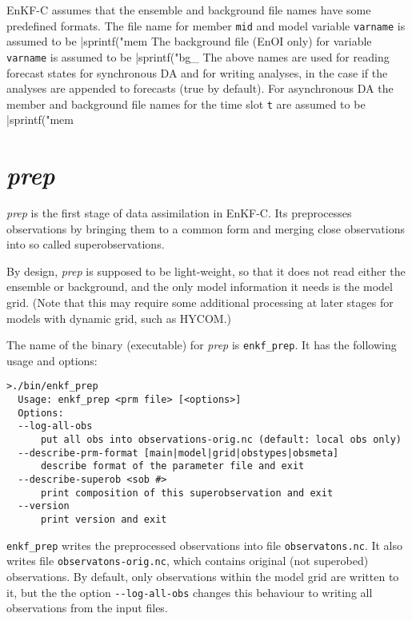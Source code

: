 \documentclass[11pt]{report}
\begin{document}
EnKF-C assumes that the ensemble and background file names have some predefined formats.
The file name for member \verb|mid| and model variable \verb|varname| is assumed to be \spverb|sprintf("mem%
The background file (EnOI only) for variable \verb|varname| is assumed to be \spverb|sprintf("bg_%
The above names are used for reading forecast states for synchronous DA and for writing analyses, in the case if the analyses are appended to forecasts (true by default).
For asynchronous DA the member and background file names for the time slot \verb|t| are assumed to be \spverb|sprintf("mem%

\section{\emph{prep}}

\emph{prep} is the first stage of data assimilation in EnKF-C.
Its preprocesses observations by bringing them to a common form and merging close observations into so called superobservations.

By design, \emph{prep} is supposed to be light-weight, so that it does not read either the ensemble or background, and the only model information it needs is the model grid. 
(Note that this may require some additional processing at later stages for models with dynamic grid, such as HYCOM.)

The name of the binary (executable) for \emph{prep} is \verb|enkf_prep|.
It has the following usage and options:
\begin{Verbatim}[frame=single,fontsize=\footnotesize]
>./bin/enkf_prep
  Usage: enkf_prep <prm file> [<options>]
  Options:
  --log-all-obs
      put all obs into observations-orig.nc (default: local obs only)
  --describe-prm-format [main|model|grid|obstypes|obsmeta]
      describe format of the parameter file and exit
  --describe-superob <sob #>
      print composition of this superobservation and exit
  --version
      print version and exit
\end{Verbatim}

\verb|enkf_prep| writes the preprocessed observations into file \verb|observatons.nc|.
It also writes file \verb|observatons-orig.nc|, which contains original (not superobed) observations.
By default, only observations within the model grid are written to it, but the the option \verb|--log-all-obs| changes this behaviour to writing all observations from the input files.
\end{document}

